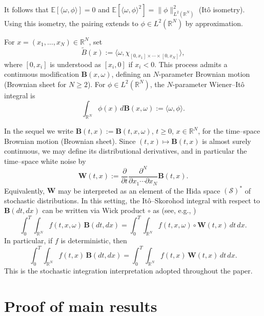 \documentclass[12pt, reqno]{amsart}
\newcommand{\R}{\ensuremath{\mathbb{R}}}
\newcommand{\bb}{\ensuremath{\mathbf{B}}}
\newcommand{\bw}{\ensuremath{\mathbf{W}}}
\begin{document}
It follows that $\mathbb{E}[\langle\omega,\phi\rangle]=0$ and
$\mathbb{E}[\langle\omega,\phi\rangle^2]=\|\phi\|_{L^2(\R^N)}^2$ (It\^o isometry).
Using this isometry, the pairing extends to $\phi\in L^2(\R^N)$ by approximation.

For $x=(x_1,\dots,x_N)\in\R^N$, set
\[
\widetilde{B}(x):=\big\langle \omega,\chi_{[0,x_1]\times\cdots\times[0,x_N]}\big\rangle,
\]
where $[0,x_i]$ is understood as $[x_i,0]$ if $x_i<0$.
This process admits a continuous modification $\bb(x,\omega)$, defining an $N$-parameter Brownian motion
(Brownian sheet for $N\ge2$).
For $\phi\in L^2(\R^N)$, the $N$-parameter Wiener--It\^o integral is
\[
\int_{\R^N}\phi(x)\,d\bb(x,\omega):=\langle\omega,\phi\rangle.
\]

In the sequel we write $\bb(t,x):=\bb(t,x,\omega)$, $t\ge0$, $x\in\R^N$,
for the time--space Brownian motion (Brownian sheet).
Since $(t,x)\mapsto\bb(t,x)$ is almost surely continuous, we may define its distributional derivatives, and in particular
the time--space white noise by
\begin{equation}\label{white-noise}
\bw(t,x):=\frac{\partial}{\partial t}\frac{\partial^N}{\partial x_1\cdots\partial x_N}\bb(t,x).
\end{equation}
Equivalently, $\bw$ may be interpreted as an element of the Hida space $(\mathcal S)^\ast$ of stochastic distributions.
In this setting, the It\^o--Skorohod integral with respect to $\bb(dt,dx)$ can be written via Wick product $\circ$ as (see, e.g., \cite{LindstromUboe,Benth})
\begin{equation}\label{Ito-Skorohod}
\int_0^T\int_{\R^N} f(t,x,\omega)\,\bb(dt,dx)
=\int_0^T\int_{\R^N} f(t,x,\omega)\circ \bw(t,x)\,dt\,dx.
\end{equation}
In particular, if $f$ is deterministic, then
\begin{equation}\label{Wiener-integral}
\int_0^T\int_{\R^N} f(t,x)\,\bb(dt,dx)
=\int_0^T\int_{\R^N} f(t,x)\,\bw(t,x)\,dt\,dx.
\end{equation}
This is the stochastic integration interpretation adopted throughout the paper.


 
\section{Proof of  main results}
\label{S3}
\end{document}
